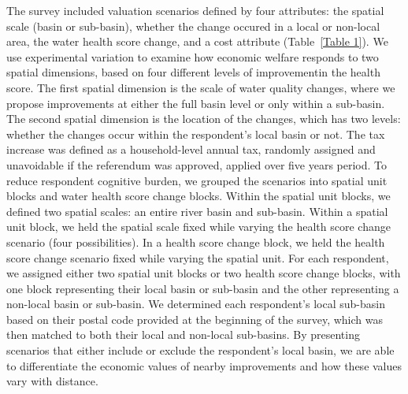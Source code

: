 \documentclass[12pt]{article}
\begin{document}
The survey included valuation scenarios defined by four attributes: the spatial scale (basin or sub-basin), whether the change occured in 
a local or non-local area, the water health score change, and a cost attribute (Table~\ref{Table 1}). We use experimental variation to examine 
how economic welfare responds to two spatial dimensions, based on four different levels of improvementin the health score. The first spatial 
dimension is the scale of water quality changes, where we propose improvements at either the full basin level or only within a sub-basin. 
The second spatial dimension is the location of the changes, which has two levels: whether the changes occur within the respondent’s local 
basin or not. The tax increase was defined as a household-level annual tax, randomly assigned and unavoidable if the referendum was approved, 
applied over five years period. To reduce respondent cognitive burden, we grouped the scenarios into spatial unit blocks and water health score 
change blocks. Within the spatial unit blocks, we defined two spatial scales: an entire river basin and sub-basin. Within a spatial unit block, 
we held the spatial scale fixed while varying the health score change scenario (four possibilities). In a health score change block, we held 
the health score change scenario fixed while varying the spatial unit. For each respondent, we assigned either two spatial unit blocks or two 
health score change blocks, with one block representing their local basin or sub-basin and the other representing a non-local basin or sub-basin.
We determined each respondent's local sub-basin based on their postal code provided at the beginning of the survey, which was then matched to 
both their local and non-local sub-basins. By presenting scenarios that either include or exclude the respondent’s local basin, we are able 
to differentiate the economic values of nearby improvements and how these values vary with distance.
\end{document}
